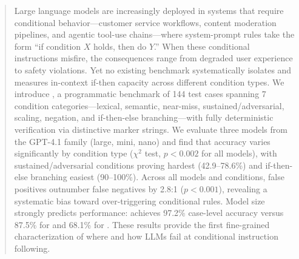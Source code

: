 \begin{abstract}
Large language models are increasingly deployed in systems that require conditional behavior---customer service workflows, content moderation pipelines, and agentic tool-use chains---where system-prompt rules take the form ``if condition $X$ holds, then do $Y$.'' When these conditional instructions misfire, the consequences range from degraded user experience to safety violations. Yet no existing benchmark systematically isolates and measures in-context if-then capacity across different condition types. We introduce \benchname, a programmatic benchmark of 144 test cases spanning 7 condition categories---lexical, semantic, near-miss, sustained/adversarial, scaling, negation, and if-then-else branching---with fully deterministic verification via distinctive marker strings. We evaluate three models from the GPT-4.1 family (large, mini, nano) and find that accuracy varies significantly by condition type ($\chi^2$ test, $p < 0.002$ for all models), with sustained/adversarial conditions proving hardest (42.9--78.6\%) and if-then-else branching easiest (90--100\%). Across all models and conditions, false positives outnumber false negatives by 2.8:1 ($p < 0.001$), revealing a systematic bias toward over-triggering conditional rules. Model size strongly predicts performance: \gptlarge achieves 97.2\% case-level accuracy versus 87.5\% for \gptmini and 68.1\% for \gptnano. These results provide the first fine-grained characterization of where and how LLMs fail at conditional instruction following.
\end{abstract}
